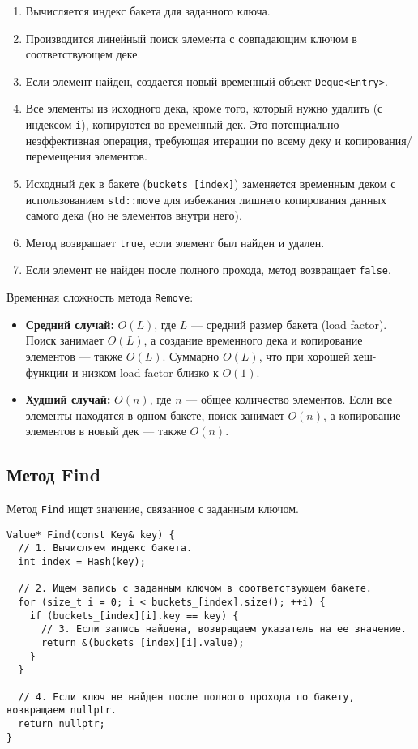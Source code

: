 \documentclass[a4paper,12pt]{article}
\begin{document}
\begin{enumerate}
    \item Вычисляется индекс бакета для заданного ключа.
    \item Производится линейный поиск элемента с совпадающим ключом в соответствующем деке.
    \item Если элемент найден, создается новый временный объект \texttt{Deque<Entry>}.
    \item Все элементы из исходного дека, кроме того, который нужно удалить (с индексом \texttt{i}), копируются во временный дек. Это потенциально неэффективная операция, требующая итерации по всему деку и копирования/перемещения элементов.
    \item Исходный дек в бакете (\texttt{buckets\_[index]}) заменяется временным деком с использованием \texttt{std::move} для избежания лишнего копирования данных самого дека (но не элементов внутри него).
    \item Метод возвращает \texttt{true}, если элемент был найден и удален.
    \item Если элемент не найден после полного прохода, метод возвращает \texttt{false}.
\end{enumerate}

Временная сложность метода \texttt{Remove}:
\begin{itemize}
    \item \textbf{Средний случай:} $O(L)$, где $L$ --- средний размер бакета (load factor). Поиск занимает $O(L)$, а создание временного дека и копирование элементов --- также $O(L)$. Суммарно $O(L)$, что при хорошей хеш-функции и низком load factor близко к $O(1)$.
    \item \textbf{Худший случай:} $O(n)$, где $n$ --- общее количество элементов. Если все элементы находятся в одном бакете, поиск занимает $O(n)$, а копирование элементов в новый дек --- также $O(n)$.
\end{itemize}

\subsection{Метод Find}

Метод \texttt{Find} ищет значение, связанное с заданным ключом.

\begin{lstlisting}[style=cpp]
Value* Find(const Key& key) {
  // 1. Вычисляем индекс бакета.
  int index = Hash(key);
  
  // 2. Ищем запись с заданным ключом в соответствующем бакете.
  for (size_t i = 0; i < buckets_[index].size(); ++i) {
    if (buckets_[index][i].key == key) {
      // 3. Если запись найдена, возвращаем указатель на ее значение.
      return &(buckets_[index][i].value);
    }
  }
  
  // 4. Если ключ не найден после полного прохода по бакету, возвращаем nullptr.
  return nullptr;
}
\end{lstlisting}
\end{document}
